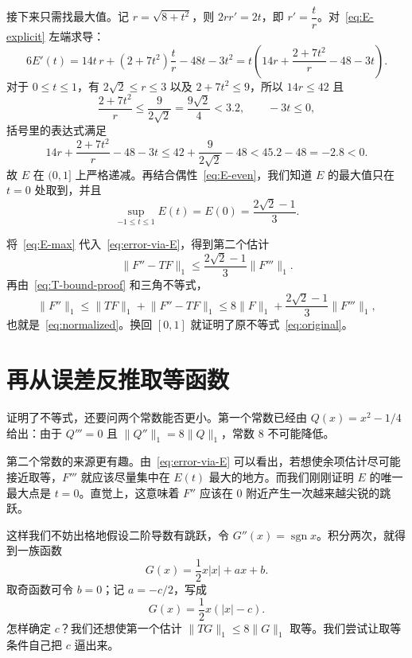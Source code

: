 \documentclass[UTF8,fontset=windows,a4paper,11pt]{ctexart}
\newcommand{\Lone}[1]{\lVert #1\rVert_1}
\begin{document}
接下来只需找最大值。记 $r=\sqrt{8+t^2}$，则 $2rr'=2t$，即 $r'=\dfrac{t}{r}$。对~\eqref{eq:E-explicit} 左端求导：
\[
    6E'(t)=14t\,r+(2+7t^2)\frac{t}{r}-48t-3t^2
    =t\left(14r+\frac{2+7t^2}{r}-48-3t\right).
\]
对于 $0\le t\le1$，有 $2\sqrt{2}\le r\le3$ 以及 $2+7t^2\le9$，所以 $14r\le42$ 且
\[
    \frac{2+7t^2}{r}\le\frac{9}{2\sqrt{2}}=\frac{9\sqrt{2}}{4}<3.2,
    \qquad -3t\le0,
\]
括号里的表达式满足
\[
    14r+\frac{2+7t^2}{r}-48-3t
    \le 42+\frac9{2\sqrt{2}}-48<45.2-48=-2.8<0.
\]
故 $E$ 在 $(0,1]$ 上严格递减。再结合偶性~\eqref{eq:E-even}，我们知道 $E$ 的最大值只在 $t=0$ 处取到，并且
\begin{equation}
    \sup_{-1\le t\le1}E(t)=E(0)=\frac{2\sqrt{2}-1}{3}.
    \label{eq:E-max}
\end{equation}

将~\eqref{eq:E-max} 代入~\eqref{eq:error-via-E}，得到第二个估计
\[
    \Lone{F''-TF}\le\frac{2\sqrt{2}-1}{3}\Lone{F'''}.
\]
再由~\eqref{eq:T-bound-proof} 和三角不等式，
\[
    \Lone{F''}
    \le\Lone{TF}+\Lone{F''-TF}
    \le8\Lone{F}+\frac{2\sqrt{2}-1}{3}\Lone{F'''},
\]
也就是~\eqref{eq:normalized}。换回 $[0,1]$ 就证明了原不等式~\eqref{eq:original}。

\section{再从误差反推取等函数}
\label{sec:sharpness}

证明了不等式，还要问两个常数能否更小。第一个常数已经由 $Q(x)=x^2-1/4$ 给出：由于 $Q'''=0$ 且 $\Lone{Q''}=8\Lone{Q}$，常数 $8$ 不可能降低。

第二个常数的来源更有趣。由~\eqref{eq:error-via-E} 可以看出，若想使余项估计尽可能接近取等，$F'''$ 就应该尽量集中在 $E(t)$ 最大的地方。而我们刚刚证明 $E$ 的唯一最大点是 $t=0$。直觉上，这意味着 $F''$ 应该在 $0$ 附近产生一次越来越尖锐的跳跃。

这样我们不妨出格地假设二阶导数有跳跃，令 $G''(x)=\operatorname{sgn}x$。积分两次，就得到一族函数
\[
    G(x)=\frac12x|x|+ax+b.
\]
取奇函数可令 $b=0$；记 $a=-c/2$，写成
\begin{equation}
    G(x)=\frac12x(|x|-c).
    \label{eq:G-general}
\end{equation}
怎样确定 $c$？我们还想使第一个估计 $\Lone{TG}\le8\Lone{G}$ 取等。我们尝试让取等条件自己把 $c$ 逼出来。
\end{document}
